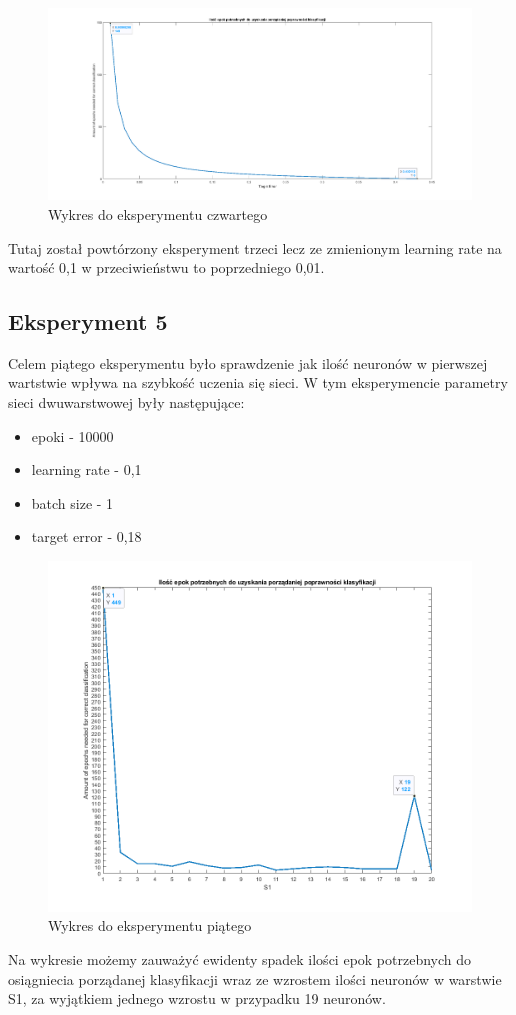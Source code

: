 \documentclass[12pt,twoside]{article}
\begin{document}
\begin{figure}[ht!]
	\centering
	\includegraphics[width=15cm]{figures/target_epo_eta=0_1.png}
	\caption{Wykres do eksperymentu czwartego}
\end{figure}
Tutaj został powtórzony eksperyment trzeci lecz ze zmienionym learning rate na wartość 0,1 w przeciwieństwu to poprzedniego 0,01.
\newpage

\subsection{Eksperyment 5}
Celem piątego eksperymentu było sprawdzenie jak ilość neuronów w pierwszej wartstwie wpływa na szybkość uczenia się sieci.
W tym eksperymencie parametry sieci dwuwarstwowej były następujące:
\begin{itemize}
	\item epoki - 10000
	\item learning rate - 0,1
	\item batch size - 1
	\item target error - 0,18
\end{itemize}
\begin{figure}[ht!]
	\centering
	\includegraphics[width=15cm]{figures/S1_epo.png}
	\caption{Wykres do eksperymentu piątego}
\end{figure}
Na wykresie możemy zauważyć ewidenty spadek ilości epok potrzebnych do osiągniecia porządanej klasyfikacji wraz ze wzrostem ilości neuronów w warstwie S1, za wyjątkiem jednego wzrostu w przypadku 19 neuronów.
\newpage
\end{document}
